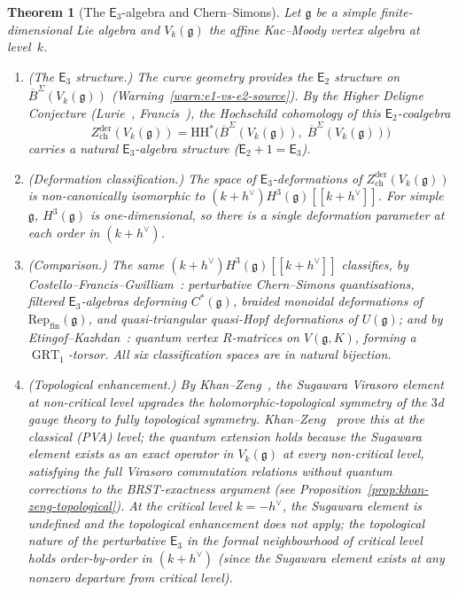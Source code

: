 \documentclass[11pt,reqno]{amsart}
\newtheorem{theorem}{Theorem}[section]
\theoremstyle{definition}
\theoremstyle{remark}
\newcommand{\HH}{\mathrm{HH}}
\newcommand{\Etwo}{\mathsf{E}_{2}}
\newcommand{\Ethree}{\mathsf{E}_{3}}
\DeclareMathOperator{\GRT}{GRT}
\newcommand{\fg}{\mathfrak{g}}
\newcommand{\BarSig}{\overline{B}^{\Sigma}}
\numberwithin{equation}{section}
\begin{document}
\begin{theorem}[The $\Ethree$-algebra and Chern--Simons]
\label{thm:e3-cs}
Let $\fg$ be a simple finite-dimensional Lie algebra and
$V_k(\fg)$ the affine Kac--Moody vertex algebra at level~$k$.
\begin{enumerate}[label=\textup{(\roman*)}]
\item \textup{(The $\Ethree$ structure.)}
  The curve geometry provides the $\Etwo$ structure on
  $\BarSig(V_k(\fg))$
  \textup{(}Warning~\textup{\ref{warn:e1-vs-e2-source}}\textup{)}.
  By the Higher Deligne Conjecture
  \textup{(}Lurie~\cite{HA}, Francis~\cite{Francis2013}\textup{)},
  the Hochschild cohomology of this $\Etwo$-coalgebra
  \begin{equation}\label{eq:e3-center}
    Z^{\mathrm{der}}_{\mathrm{ch}}(V_k(\fg))
    = \HH^*\bigl(\BarSig(V_k(\fg)),\;
    \BarSig(V_k(\fg))\bigr)
  \end{equation}
  carries a natural $\Ethree$-algebra structure
  \textup{(}$\Etwo + 1 = \Ethree$\textup{)}.
\item \textup{(Deformation classification.)}
  The space of $\Ethree$-deformations of
  $Z^{\mathrm{der}}_{\mathrm{ch}}(V_k(\fg))$
  is non-canonically isomorphic to
  $(k+h^\vee) H^3(\fg)[[k+h^\vee]]$. For simple~$\fg$,
  $H^3(\fg)$ is one-dimensional, so there is a single
  deformation parameter at each order in $(k+h^\vee)$.
\item \textup{(Comparison.)}
  The same $(k+h^\vee) H^3(\fg)[[k+h^\vee]]$ classifies, by
  Costello--Francis--Gwilliam~\cite{CFG26}:
  perturbative Chern--Simons quantisations,
  filtered $\Ethree$-algebras deforming $C^*(\fg)$,
  braided monoidal deformations of
  $\mathrm{Rep}_{\mathrm{fin}}(\fg)$, and
  quasi-triangular quasi-Hopf deformations of $U(\fg)$;
  and by Etingof--Kazhdan~\cite{EK96,EK00}:
  quantum vertex $R$-matrices on $V(\fg, K)$, forming
  a $\GRT_1$-torsor.
  All six classification spaces are in natural bijection.
\item \textup{(Topological enhancement.)}
  By Khan--Zeng~\cite{KhanZeng25}, the Sugawara Virasoro
  element at non-critical level upgrades the
  holomorphic-topological symmetry of the $3$d gauge theory
  to fully topological symmetry.
  Khan--Zeng~\cite{KhanZeng25} prove this at the
  classical \textup{(}PVA\textup{)} level; the quantum
  extension holds because the Sugawara element exists as
  an exact operator in $V_k(\fg)$ at every non-critical
  level, satisfying the full Virasoro commutation relations
  without quantum corrections to the BRST-exactness
  argument \textup{(}see
  Proposition~\ref{prop:khan-zeng-topological}\textup{)}.
  At the critical level $k = -h^\vee$, the
  Sugawara element is undefined and the topological
  enhancement does not apply; the topological nature of
  the perturbative $\Ethree$ in the formal neighbourhood
  of critical level holds
  order-by-order in $(k + h^\vee)$
  \textup{(}since the Sugawara element exists at any
  nonzero departure from critical level\textup{)}.
\end{enumerate}
\end{theorem}
\end{document}

